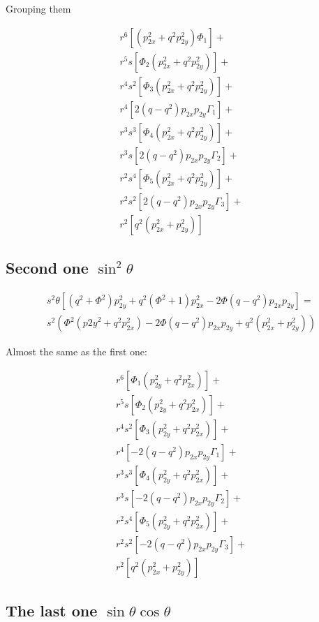 \documentclass{article}
\begin{document}
Grouping them

\begin{align*}
r^6[(p_{2x}^2+q^2p_{2y}^2)\Phi_1]+\\
r^5s[\Phi_2(p_{2x}^2+q^2p_{2y}^2)]+\\
r^4s^2[\Phi_3(p_{2x}^2+q^2p_{2y}^2)]+\\
r^4[2(q-q^2)p_{2x}p_{2y}\Gamma_1]+\\
r^3s^3[\Phi_4(p_{2x}^2+q^2p_{2y}^2)]+\\
r^3s[2(q-q^2)p_{2x}p_{2y}\Gamma_2]+\\
r^2s^4[\Phi_5(p_{2x}^2+q^2p_{2y}^2)]+\\
r^2s^2[2(q-q^2)p_{2x}p_{2y}\Gamma_3]+\\
r^2[q^2(p_{2x}^2+p_{2y}^2)]
\end{align*}

\subsection{Second one $\sin^2{\theta}$}

\begin{align*}
s^2{\theta}[(q^2+\Phi^2)p_{2y}^2 + q^2(\Phi^2+1)p_{2x}^2 - 2\Phi(q-q^2)p_{2x}p_{2y}]=\\
s^2(\Phi^2(p{2y}^2+q^2p_{2x}^2)-2\Phi(q-q^2)p_{2x}p_{2y}+q^2(p_{2x}^2+p_{2y}^2))
\end{align*}

Almost the same as the first one:

\begin{align*}
r^6[\Phi_1(p_{2y}^2+q^2p_{2x}^2)]+\\
r^5s[\Phi_2(p_{2y}^2+q^2p_{2x}^2)]+\\
r^4s^2[\Phi_3(p_{2y}^2+q^2p_{2x}^2)]+\\
r^4[-2(q-q^2)p_{2x}p_{2y}\Gamma_1]+\\
r^3s^3[\Phi_4(p_{2y}^2+q^2p_{2x}^2)]+\\
r^3s[-2(q-q^2)p_{2x}p_{2y}\Gamma_2]+\\
r^2s^4[\Phi_5(p_{2y}^2+q^2p_{2x}^2)]+\\
r^2s^2[-2(q-q^2)p_{2x}p_{2y}\Gamma_3]+\\
r^2[q^2(p_{2x}^2+p_{2y}^2)]
\end{align*}

\subsection{The last one $\sin{\theta}\cos{\theta}$}
\end{document}
